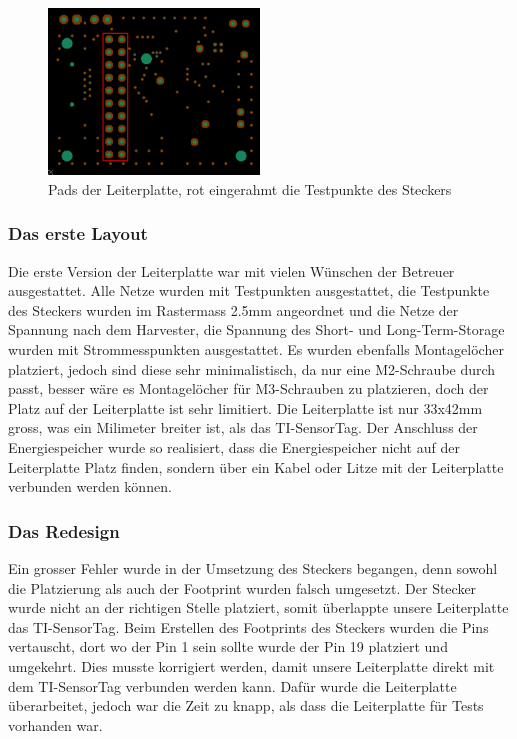 \begin{figure}[ht]
    \includegraphics[width=0.5\textwidth]{3Vorgehen/imag/Layout_Testpunkteraster.png}
    \caption{Pads der Leiterplatte, rot eingerahmt die Testpunkte des Steckers}\label{layout_testpunkteraster} 
\end{figure}

\subsubsection{Das erste Layout}

Die erste Version der Leiterplatte war mit vielen Wünschen der Betreuer ausgestattet. Alle Netze wurden mit Testpunkten ausgestattet, die Testpunkte des Steckers wurden im Rastermass 2.5mm angeordnet und die Netze der Spannung nach dem Harvester, die Spannung des Short- und Long-Term-Storage wurden mit Strommesspunkten ausgestattet. Es wurden ebenfalls Montagelöcher platziert, jedoch sind diese sehr minimalistisch, da nur eine M2-Schraube durch passt, besser wäre es Montagelöcher für M3-Schrauben zu platzieren, doch der Platz auf der Leiterplatte ist sehr limitiert. Die Leiterplatte ist nur 33x42mm gross, was ein Milimeter breiter ist, als das TI-SensorTag. Der Anschluss der Energiespeicher wurde so realisiert, dass die Energiespeicher nicht auf der Leiterplatte Platz finden, sondern über ein Kabel oder Litze mit der Leiterplatte verbunden werden können.

\subsubsection{Das Redesign}

Ein grosser Fehler wurde in der Umsetzung des Steckers begangen, denn sowohl die Platzierung als auch der Footprint wurden falsch umgesetzt. Der Stecker wurde nicht an der richtigen Stelle platziert, somit überlappte unsere Leiterplatte das TI-SensorTag. Beim Erstellen des Footprints des Steckers wurden die Pins vertauscht, dort wo der Pin 1 sein sollte wurde der Pin 19 platziert und umgekehrt. Dies musste korrigiert werden, damit unsere Leiterplatte direkt mit dem TI-SensorTag verbunden werden kann. Dafür wurde die Leiterplatte überarbeitet, jedoch war die Zeit zu knapp, als dass die Leiterplatte für Tests vorhanden war.

